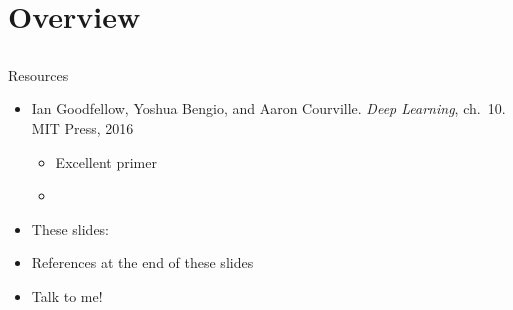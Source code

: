\section{Overview}
\subsection{}

\begin{frame}{Resources}
    \begin{itemize}
        \item Ian Goodfellow, Yoshua Bengio, and Aaron Courville.
        \emph{Deep Learning}, ch.~10. MIT Press, 2016
        \nocite{GoodfellowDL}
        \begin{itemize}
            \item Excellent primer
            \item {}
        \end{itemize}
        \item These slides: 
        \item References at the end of these slides
        \item Talk to me! \smiley
    \end{itemize}
\end{frame}

